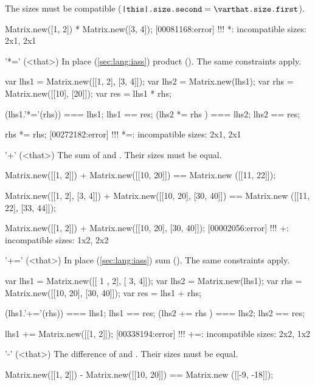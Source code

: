 \begin{urbiscriptapi}
The sizes must be compatible ($\texttt{\this.size.second} =
\texttt{\that.size.first}$).
\begin{urbiscript}
Matrix.new([1, 2]) * Matrix.new([3, 4]);
[00081168:error] !!! *: incompatible sizes: 2x1, 2x1
\end{urbiscript}

\item['*='](<that>)%
  In place (\autoref{sec:lang:iass}) product ().  The same
  constraints apply.
\begin{urbiassert}
var lhs1 = Matrix.new([[1, 2], [3, 4]]);
var lhs2 = Matrix.new(lhs1);
var rhs = Matrix.new([[10], [20]]);
var res = lhs1 * rhs;

(lhs1.'*='(rhs)) === lhs1;  lhs1 == res;
(lhs2  *=  rhs ) === lhs2;  lhs2 == res;

rhs *= rhs;
[00272182:error] !!! *=: incompatible sizes: 2x1, 2x1
\end{urbiassert}


\item['+'](<that>)%
  The sum of \this and \that.  Their sizes must be equal.
\begin{urbiassert}
Matrix.new([[1, 2]]) + Matrix.new([[10, 20]])
  == Matrix.new ([[11, 22]]);

Matrix.new([[1, 2], [3, 4]]) + Matrix.new([[10, 20], [30, 40]])
  == Matrix.new ([[11, 22], [33, 44]]);

Matrix.new([[1, 2]]) + Matrix.new([[10, 20], [30, 40]]);
[00002056:error] !!! +: incompatible sizes: 1x2, 2x2
\end{urbiassert}


\item['+='](<that>)%
  In place (\autoref{sec:lang:iass}) sum ().  The same
  constraints apply.
\begin{urbiassert}
var lhs1 = Matrix.new([[ 1 , 2], [ 3,  4]]);
var lhs2 = Matrix.new(lhs1);
var rhs = Matrix.new([[10, 20], [30, 40]]);
var res = lhs1 + rhs;

(lhs1.'+='(rhs)) === lhs1;  lhs1 == res;
(lhs2  +=  rhs ) === lhs2;  lhs2 == res;

lhs1 += Matrix.new([[1, 2]]);
[00338194:error] !!! +=: incompatible sizes: 2x2, 1x2
\end{urbiassert}


\item['-'](<that>)%
  The difference of \this and \that.  Their sizes must be equal.
\begin{urbiassert}
Matrix.new([[1, 2]]) - Matrix.new([[10, 20]])
  == Matrix.new ([[-9, -18]]);


\end{urbiassert}
\end{urbiscriptapi}
